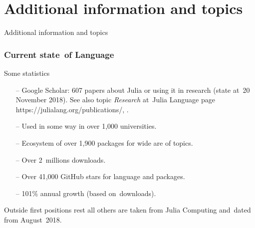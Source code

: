 \documentclass{beamer}  %
\begin{document}
\section[]{Additional information and topics}





\begin{frame}

  \begin{center}
    \LARGE
    Additional information and topics
  \end{center}

\end{frame}





\begin{frame}
  \frametitle{Current state~of Language}

  \begin{block}{Some statistics}
    \begin{itemize}
    \item[--] Google Scholar: 607 papers about Julia or using it in
      research (state at~20 November 2018). See also topic
      \emph{Research} at~Julia Language page
      https://julialang.org/publications/,
      .
    \item[--] Used in some way in over 1,000 universities.
    \item[--] Ecosystem of over 1,900 packages for wide are of topics.
    \item[--] Over 2~millions downloads.
    \item[--] Over 41,000 GitHub stars for language and packages.
    \item[--] 101\% annual growth (based on~downloads).
    \end{itemize}
    Outside first positions rest all others are taken from Julia
    Computing and~dated from August~2018.
  \end{block}

\end{frame}
\end{document}
